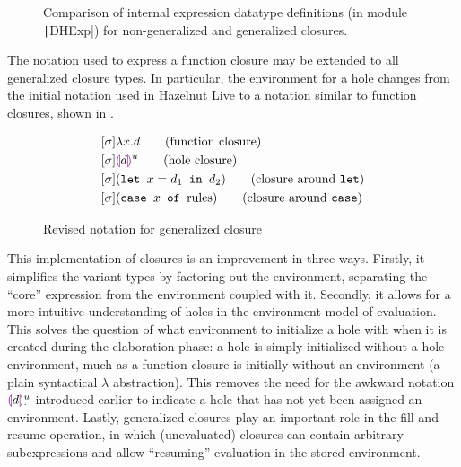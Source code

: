 \begin{figure}
  \centering
  \begin{singlespace}
  \end{singlespace}
  \caption{Comparison of internal expression datatype definitions (in module \texttt|DHExp|) for non-generalized and generalized closures.}
  \label{fig:generalized-closures-datatypes}
\end{figure}

The notation used to express a function closure may be extended to all generalized closure types. In particular, the environment for a hole changes from the initial notation used in Hazelnut Live to a notation similar to function closures, shown in .

\begin{figure}
  \centering
  \begin{singlespace}
    \begin{align}
      \label{eq:generalized-closure-notation}
      &[\env]\lambda x.d\tag{function closure} \\
      &[\env]\hhole{d}^u\tag{hole closure} \\
      &[\env](\texttt{let }x=d_1\texttt{ in }d_2)\tag{closure around \texttt{let}} \\
      &[\env](\texttt{case }x\texttt{ of }\text{rules})\tag{closure around \texttt{case}}
    \end{align}
  \end{singlespace}
  \caption{Revised notation for generalized closure}
  \label{fig:generalized-closure-notation}
\end{figure}

This implementation of closures is an improvement in three ways. Firstly, it simplifies the variant types by factoring out the environment, separating the ``core'' expression from the environment coupled with it. Secondly, it allows for a more intuitive understanding of holes in the environment model of evaluation. This solves the question of what environment to initialize a hole with when it is created during the elaboration phase: a hole is simply initialized without a hole environment, much as a function closure is initially without an environment (a plain syntactical $\lambda$ abstraction). This removes the need for the awkward notation $\textcolor{violet}{\llparenthesis} d\textcolor{violet}{\rrparenthesis}_\cdot^u$ introduced earlier to indicate a hole that has not yet been assigned an environment. Lastly, generalized closures play an important role in the fill-and-resume operation, in which (unevaluated) closures can contain arbitrary subexpressions and allow ``resuming'' evaluation in the stored environment.

